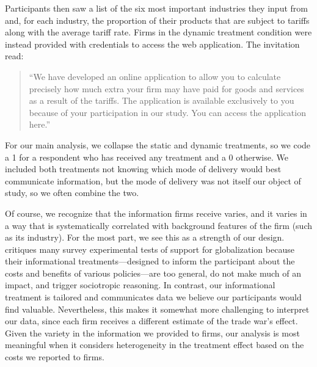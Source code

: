 \documentclass{article}
\begin{document}
Participants then saw a list of the six most important industries they input from and, for each industry, the proportion of their products that are subject to tariffs along with the average tariff rate. Firms in the dynamic treatment condition were instead provided with credentials to access the web application. The invitation read:

\begin{quotation}
``We have developed an online application to allow you to calculate precisely how much extra your firm may have paid for goods and services as a result of the tariffs. The application is available exclusively to you because of your participation in our study. You can access the application here.''
\end{quotation} 


For our main analysis, we collapse the static and dynamic treatments, so we code a 1 for a respondent who has received any treatment and a 0 otherwise. We included both treatments not knowing which mode of delivery would best communicate information, but the mode of delivery was not itself our object of study, so we often combine the two.

Of course, we recognize that the information firms receive varies, and it varies in a way that is systematically correlated with background features of the firm (such as its industry). For the most part, we see this as a strength of our design. \citet{naoi2020survey} critiques many survey experimental tests of support for globalization because their informational treatments---designed to inform the participant about the costs and benefits of various policies---are too general, do not make much of an impact, and trigger sociotropic reasoning. In contrast, our informational treatment is tailored and communicates data we believe our participants would find valuable. Nevertheless, this makes it somewhat more challenging to interpret our data, since each firm receives a different estimate of the trade war's effect. Given the variety in the information we provided to firms, our analysis is most meaningful when it considers heterogeneity in the treatment effect based on the costs we reported to firms.
\end{document}

